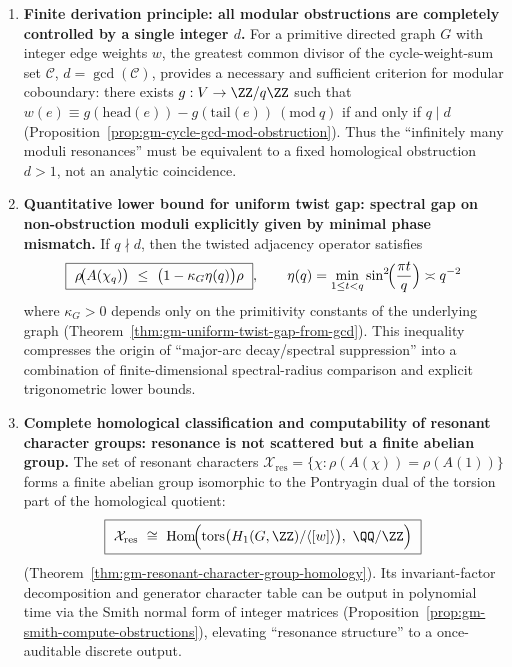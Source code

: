 \begin{enumerate}
  \item \textbf{Finite derivation principle: all modular obstructions are completely controlled by a single integer \texorpdfstring{$d$}{d}.}
  For a primitive directed graph \(G\) with integer edge weights \(w\), the greatest common divisor of the cycle-weight-sum set \(\mathcal{C}\),
  \(d=\gcd(\mathcal{C})\),
  provides a necessary and sufficient criterion for modular coboundary: there exists \(g:V\to\ZZ/q\ZZ\) such that
  \(w(e)\equiv g(\mathrm{head}(e))-g(\mathrm{tail}(e))\ (\mathrm{mod}\ q)\)
  if and only if \(q\mid d\) (Proposition~\ref{prop:gm-cycle-gcd-mod-obstruction}).
  Thus the ``infinitely many moduli resonances'' must be equivalent to a fixed homological obstruction \(d>1\), not an analytic coincidence.

  \item \textbf{Quantitative lower bound for uniform twist gap: spectral gap on non-obstruction moduli explicitly given by minimal phase mismatch.}
  If \(q\nmid d\), then the twisted adjacency operator satisfies
  \[
  \boxed{\ \rho\!\bigl(A(\chi_q)\bigr)\ \le\ \bigl(1-\kappa_G\eta(q)\bigr)\rho\ },
  \qquad
  \eta(q)=\min_{1\le t<q}\sin^2\!\Bigl(\frac{\pi t}{q}\Bigr)\asymp q^{-2}
  \]
  where \(\kappa_G>0\) depends only on the primitivity constants of the underlying graph (Theorem~\ref{thm:gm-uniform-twist-gap-from-gcd}).
  This inequality compresses the origin of ``major-arc decay/spectral suppression'' into a combination of finite-dimensional spectral-radius comparison and explicit trigonometric lower bounds.

  \item \textbf{Complete homological classification and computability of resonant character groups: resonance is not scattered but a finite abelian group.}
  The set of resonant characters
  \(\mathcal{X}_{\mathrm{res}}=\{\chi:\rho(A(\chi))=\rho(A(1))\}\)
  forms a finite abelian group isomorphic to the Pontryagin dual of the torsion part of the homological quotient:
  \[
  \boxed{\ \mathcal{X}_{\mathrm{res}}\ \cong\ \mathrm{Hom}\!\Bigl(\mathrm{tors}\bigl(H_1(G,\ZZ)/\langle[w]\rangle\bigr),\ \QQ/\ZZ\Bigr)\ }
  \]
  (Theorem~\ref{thm:gm-resonant-character-group-homology}).
  Its invariant-factor decomposition and generator character table can be output in polynomial time via the Smith normal form of integer matrices (Proposition~\ref{prop:gm-smith-compute-obstructions}), elevating ``resonance structure'' to a once-auditable discrete output.


\end{enumerate}

